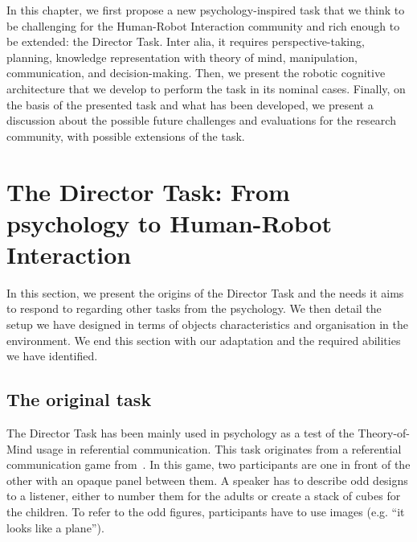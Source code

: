 In this chapter, we first propose a new psychology-inspired task that we think to be challenging for the Human-Robot Interaction community and rich enough to be extended: the Director Task. Inter alia, it requires perspective-taking, planning, knowledge representation with theory of mind, manipulation, communication, and decision-making. Then, we present the robotic cognitive architecture that we develop to perform the task in its nominal cases. Finally, on the basis of the presented task and what has been developed, we present a discussion about the possible future challenges and evaluations for the research community, with possible extensions of the task.

\section[From psychology to Human-Robot Interaction]{The Director Task: From psychology to Human-Robot Interaction}

In this section, we present the origins of the Director Task and the needs it aims to respond to regarding other tasks from the psychology. We then detail the setup we have designed in terms of objects characteristics and organisation in the environment. We end this section with our adaptation and the required abilities we have identified.

\subsection{The original task}

The Director Task has been mainly used in psychology as a test of the Theory-of-Mind usage in referential communication. This task originates from a referential communication game from~\cite{krauss_1977_social}. In this game, two participants are one in front of the other with an opaque panel between them. A speaker has to describe odd designs to a listener, either to number them for the adults or create a stack of cubes for the children. To refer to the odd figures, participants have to use images (e.g. ``it looks like a plane'').

